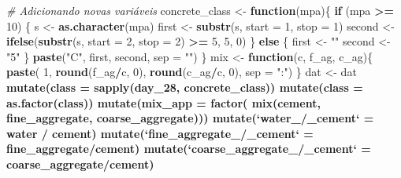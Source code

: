 \documentclass[]{article}
\newenvironment{Shaded}{\begin{snugshade}}{\end{snugshade}}
\newcommand{\CommentTok}[1]{\textcolor[rgb]{0.56,0.35,0.01}{\textit{#1}}}
\newcommand{\ControlFlowTok}[1]{\textcolor[rgb]{0.13,0.29,0.53}{\textbf{#1}}}
\newcommand{\DataTypeTok}[1]{\textcolor[rgb]{0.13,0.29,0.53}{#1}}
\newcommand{\DecValTok}[1]{\textcolor[rgb]{0.00,0.00,0.81}{#1}}
\newcommand{\KeywordTok}[1]{\textcolor[rgb]{0.13,0.29,0.53}{\textbf{#1}}}
\newcommand{\NormalTok}[1]{#1}
\newcommand{\OperatorTok}[1]{\textcolor[rgb]{0.81,0.36,0.00}{\textbf{#1}}}
\newcommand{\StringTok}[1]{\textcolor[rgb]{0.31,0.60,0.02}{#1}}
\begin{document}
\begin{Shaded}
\begin{Highlighting}[]
\CommentTok{# Adicionando novas variáveis}
\NormalTok{concrete_class <-}\StringTok{ }\ControlFlowTok{function}\NormalTok{(mpa)\{}
  \ControlFlowTok{if}\NormalTok{ (mpa }\OperatorTok{>=}\StringTok{ }\DecValTok{10}\NormalTok{) \{}
\NormalTok{    s <-}\StringTok{ }\KeywordTok{as.character}\NormalTok{(mpa)}
\NormalTok{    first <-}\StringTok{ }\KeywordTok{substr}\NormalTok{(s, }\DataTypeTok{start =} \DecValTok{1}\NormalTok{, }\DataTypeTok{stop =} \DecValTok{1}\NormalTok{)}
\NormalTok{    second <-}\StringTok{ }\KeywordTok{ifelse}\NormalTok{(}\KeywordTok{substr}\NormalTok{(s, }\DataTypeTok{start =} \DecValTok{2}\NormalTok{, }\DataTypeTok{stop =} \DecValTok{2}\NormalTok{) }\OperatorTok{>=}\StringTok{ }\DecValTok{5}\NormalTok{, }\DecValTok{5}\NormalTok{, }\DecValTok{0}\NormalTok{)}
\NormalTok{  \}}
  \ControlFlowTok{else}\NormalTok{ \{}
\NormalTok{    first <-}\StringTok{ ""}
\NormalTok{    second <-}\StringTok{ "5"}
\NormalTok{  \}}
  \KeywordTok{paste}\NormalTok{(}\StringTok{"C"}\NormalTok{, first, second, }\DataTypeTok{sep =} \StringTok{""}\NormalTok{)}
\NormalTok{\}}
\NormalTok{mix <-}\StringTok{ }\ControlFlowTok{function}\NormalTok{(c, f_ag, c_ag)\{}
  \KeywordTok{paste}\NormalTok{(}
    \DecValTok{1}\NormalTok{,}
    \KeywordTok{round}\NormalTok{(f_ag}\OperatorTok{/}\NormalTok{c, }\DecValTok{0}\NormalTok{),}
    \KeywordTok{round}\NormalTok{(c_ag}\OperatorTok{/}\NormalTok{c, }\DecValTok{0}\NormalTok{),}
    \DataTypeTok{sep =} \StringTok{":"}\NormalTok{)}
\NormalTok{\}}
\NormalTok{dat <-}\StringTok{ }\NormalTok{dat }\OperatorTok{%
\StringTok{  }\KeywordTok{mutate}\NormalTok{(}\DataTypeTok{class =} \KeywordTok{sapply}\NormalTok{(day_}\DecValTok{28}\NormalTok{, concrete_class)) }\OperatorTok{%
\StringTok{  }\KeywordTok{mutate}\NormalTok{(}\DataTypeTok{class =} \KeywordTok{as.factor}\NormalTok{(class)) }\OperatorTok{%
\StringTok{  }\KeywordTok{mutate}\NormalTok{(}\DataTypeTok{mix_app =} \KeywordTok{factor}\NormalTok{(}
    \KeywordTok{mix}\NormalTok{(cement, fine_aggregate, coarse_aggregate))) }\OperatorTok{%
\StringTok{  }\KeywordTok{mutate}\NormalTok{(}\StringTok{`}\DataTypeTok{water_/_cement}\StringTok{`}\NormalTok{ =}\StringTok{ }\NormalTok{water }\OperatorTok{/}\StringTok{ }\NormalTok{cement) }\OperatorTok{%
\StringTok{  }\KeywordTok{mutate}\NormalTok{(}\StringTok{`}\DataTypeTok{fine_aggregate_/_cement}\StringTok{`}\NormalTok{ =}\StringTok{ }\NormalTok{fine_aggregate}\OperatorTok{/}\NormalTok{cement) }\OperatorTok{%
\StringTok{  }\KeywordTok{mutate}\NormalTok{(}\StringTok{`}\DataTypeTok{coarse_aggregate_/_cement}\StringTok{`}\NormalTok{ =}\StringTok{ }\NormalTok{coarse_aggregate}\OperatorTok{/}\NormalTok{cement) }\OperatorTok{%
}}}}}}}
\end{Highlighting}
\end{Shaded}
\end{document}
